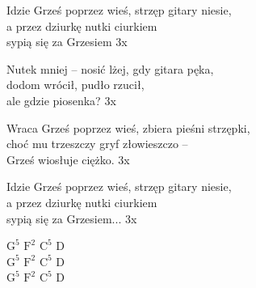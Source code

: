 \begin{text}
    Idzie Grześ poprzez wieś, strzęp gitary niesie,\\
    a przez dziurkę nutki ciurkiem\\
    sypią się za Grzesiem 3x

    Nutek mniej – nosić lżej, gdy gitara pęka,\\
    dodom wrócił, pudło rzucił,\\
    ale gdzie piosenka? 3x

    Wraca Grześ poprzez wieś, zbiera pieśni strzępki,\\
    choć mu trzeszczy gryf złowieszczo –\\
    Grześ wiosłuje ciężko. 3x

    Idzie Grześ poprzez wieś, strzęp gitary niesie,\\
    a przez dziurkę nutki ciurkiem\\
    sypią się za Grzesiem... 3x
\end{text}
\begin{chord}
    $\mathrm{G^5}$ $\mathrm{F^2}$ $\mathrm{C^5}$ D\\
    $\mathrm{G^5}$ $\mathrm{F^2}$ $\mathrm{C^5}$ D\\
    $\mathrm{G^5}$ $\mathrm{F^2}$ $\mathrm{C^5}$ D
\end{chord}

